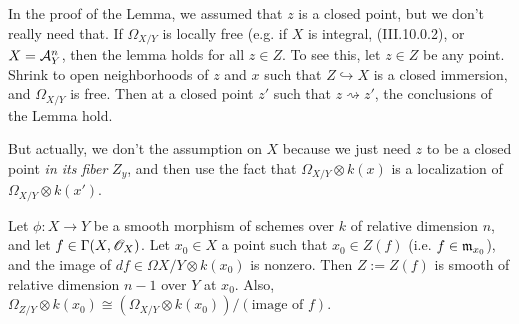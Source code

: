  In the proof of the Lemma, we assumed that $z$ is a closed point, but we don't
 really need that.  If $\Omega_{X/Y}$ is locally free (e.g. if $X$ is integral,
 (III.10.0.2), or $X=\mathcal{A}^n_Y$, then the lemma holds for all $z\in Z$.  To see this,
 let $z\in Z$ be any point.  Shrink to open neighborhoods of $z$ and $x$ such that
 $Z\hookrightarrow X$ is a closed immersion, and $\Omega_{X/Y}$ is free.  Then at a
 closed point $z'$ such that $z\rightsquigarrow z'$, the conclusions of the Lemma
 hold.

 But actually, we don't the assumption on $X$ because we just need $z$ to be a closed
 point \emph{in its fiber} $Z_y$, and then use the fact that $\Omega_{X/Y}\otimes
 k(x)$ is a localization of $\Omega_{X/Y}\otimes k(x')$.

 \begin{lemma}\label{lec28lem2} Let $\phi:X\to Y$ be a smooth morphism of schemes
 over $k$ of relative dimension $n$, and let $f\in \Gamma(X,\mathscr{O}_X)$. Let $x_0\in X$ a point such
 that $x_0\in Z(f)$ (i.e. $f\in \mathfrak{m}_{x_0}$), and the image of $df\in \Omega{X/Y}\otimes
 k(x_0)$ is nonzero.  Then $Z:=Z(f)$ is smooth of relative dimension $n-1$ over $Y$ at
 $x_0$.  Also, $\Omega_{Z/Y}\otimes k(x_0) \cong (\Omega_{X/Y}\otimes k(x_0))/(\text{image
 of } f)$.
 \end{lemma}

